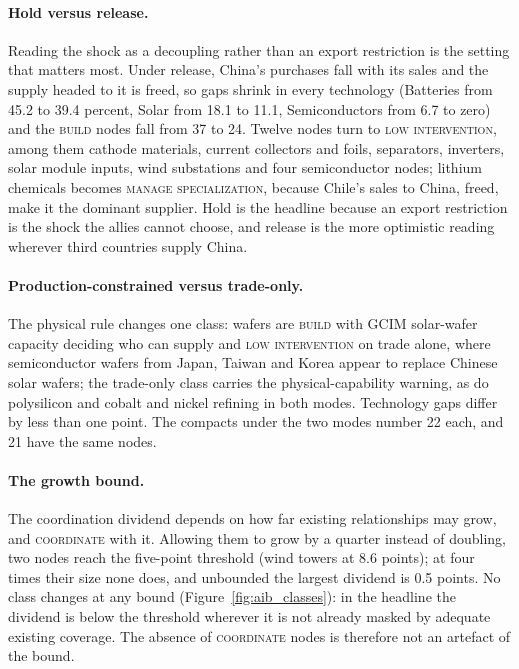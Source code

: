 \paragraph{Hold versus release.} Reading the shock as a decoupling rather than an export restriction is
the setting that matters most. Under release, China's purchases fall with its sales and the supply
headed to it is freed, so gaps shrink in every technology (Batteries from 45.2 to 39.4 percent, Solar
from 18.1 to 11.1, Semiconductors from 6.7 to zero) and the \textsc{build} nodes fall from 37 to 24. Twelve
nodes turn to \textsc{low intervention}, among them cathode materials, current collectors and foils,
separators, inverters, solar module inputs, wind substations and four semiconductor nodes; lithium
chemicals becomes \textsc{manage specialization}, because Chile's sales to China, freed, make it the
dominant supplier. Hold is the headline because an export restriction is the shock the allies cannot
choose, and release is the more optimistic reading wherever third countries supply China.

\paragraph{Production-constrained versus trade-only.} The physical rule changes one class: wafers are
\textsc{build} with GCIM solar-wafer capacity deciding who can supply and \textsc{low intervention} on
trade alone, where semiconductor wafers from Japan, Taiwan and Korea appear to replace Chinese solar
wafers; the trade-only class carries the physical-capability warning, as do polysilicon and cobalt and
nickel refining in both modes. Technology gaps differ by less than one point. The compacts under the two
modes number 22 each, and 21 have the same nodes.

\paragraph{The growth bound.} The coordination dividend depends on how far existing relationships may
grow, and \textsc{coordinate} with it. Allowing them to grow by a quarter instead of doubling, two nodes
reach the five-point threshold (wind towers at 8.6 points); at four times their size none does, and
unbounded the largest dividend is 0.5 points. No class changes at any bound (Figure~\ref{fig:aib_classes}):
in the headline the dividend is below the threshold wherever it is not already masked by adequate
existing coverage. The absence of \textsc{coordinate} nodes is therefore not an artefact of the bound.

